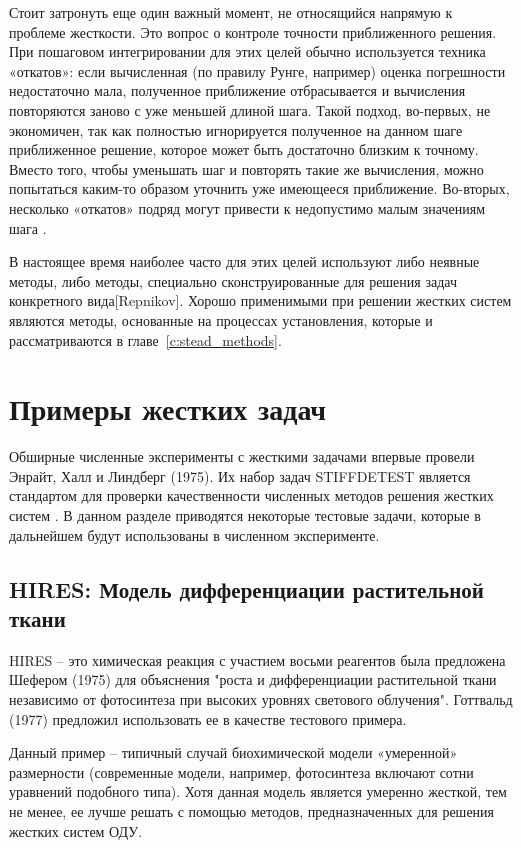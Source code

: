 \documentclass[a4paper,14pt]{extreport}
\begin{document}
 
 Стоит затронуть еще один важный момент, не относящийся напрямую к проблеме жесткости. Это вопрос о контроле точности приближенного решения. При пошаговом интегрировании для этих целей обычно используется техника «откатов»: если вычисленная (по правилу Рунге, например) оценка погрешности недостаточно мала, полученное приближение отбрасывается и вычисления повторяются заново с уже меньшей длиной шага. Такой подход, во-первых, не экономичен, так как полностью игнорируется полученное на данном шаге приближенное решение, которое может быть достаточно близким к точному. Вместо того, чтобы уменьшать шаг и повторять такие же вычисления, можно попытаться каким-то образом уточнить уже имеющееся приближение. Во-вторых, несколько «откатов» подряд могут привести к недопустимо малым
значениям шага \cite{Faleichik_Vych_alg}.

В настоящее время наиболее часто для этих целей используют либо неявные методы, либо методы, специально сконструированные для решения задач конкретного вида[Repnikov]. Хорошо применимыми при решении жестких систем являются методы, основанные на процессах установления, которые и рассматриваются в главе~\ref{c:stead_methods}. 

  
  \section{Примеры жестких задач}
  \label{s:stiff_examples}  
  Обширные численные эксперименты с жесткими задачами впервые провели Энрайт, Халл и Линдберг (1975). Их набор задач STIFFDETEST является стандартом для проверки качественности численных методов решения жестких систем \cite{hairer}. В данном разделе приводятся некоторые тестовые задачи, которые в дальнейшем будут использованы в численном эксперименте.
  
  \subsection{HIRES: Модель дифференциации растительной ткани}
  \label{ss:hires}
  HIRES -- это химическая реакция с участием восьми реагентов была предложена Шефером (1975) для объяснения "роста и дифференциации растительной ткани независимо от фотосинтеза при высоких уровнях светового облучения". Готтвальд (1977) предложил использовать ее в качестве тестового примера\cite{hairer}.
  
 Данный пример -- типичный случай биохимической модели «умеренной» размерности (современные модели, например, фотосинтеза включают сотни уравнений подобного типа). Хотя данная модель является умеренно жесткой, тем не менее, ее лучше решать с помощью методов, предназначенных для решения жестких систем ОДУ\cite{holodov}.
   
\end{document}
